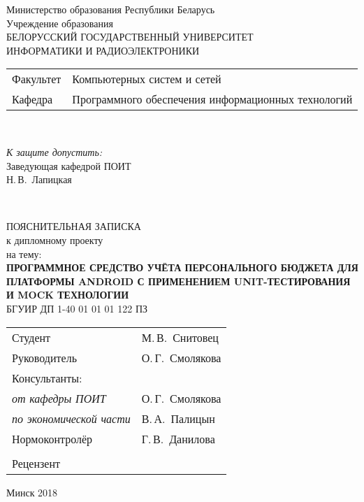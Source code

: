 \begin{titlepage}
  \begin{center}
    Министерство образования Республики Беларусь\\[1em]
    Учреждение образования\\
    БЕЛОРУССКИЙ ГОСУДАРСТВЕННЫЙ УНИВЕРСИТЕТ \\
    ИНФОРМАТИКИ И РАДИОЭЛЕКТРОНИКИ\\[1em]

    \begin{minipage}{\textwidth}
      \begin{flushleft}
        \begin{tabular}{ l l }
          Факультет & Компьютерных систем и сетей\\
          Кафедра   & Программного обеспечения информационных технологий
        \end{tabular}
      \end{flushleft}
    \end{minipage}\\[3em]

    \begin{flushright}
      \begin{minipage}{0.4\textwidth}
        \textit{К защите допустить:}\\[0.8em]
        Заведующая кафедрой ПОИТ\\[0.45em]
        \underline{\hspace*{2.8cm}} Н.\,В.~Лапицкая
      \end{minipage}\\[2.2em]
    \end{flushright}

    {ПОЯСНИТЕЛЬНАЯ ЗАПИСКА}\\
    {к дипломному проекту}\\
    {на тему:}\\[1em]
    \textbf{\large\MakeUppercase{Программное средство учёта персонального бюджета для платформы Android с применением Unit-тестирования и Mock технологии}}\\[1em]


    {БГУИР ДП 1-40 01 01 01 122 ПЗ}\\[2em]
    
    \begin{tabular}{ p{}p{} }
      Студент & М.\,В.~Снитовец \\
      Руководитель & О.\,Г.~Смолякова \\
      Консультанты: &\\
      \hspace*{3ex}\emph{от кафедры ПОИТ} & О.\,Г.~Смолякова \\
      \hspace*{3ex}\emph{по экономической части} & В.\,А.~Палицын \\
      Нормоконтролёр & Г.\,В.~Данилова \\
      & \\
      Рецензент &
    \end{tabular}
    
    \vfill
    {\normalsize Минск 2018}
  \end{center}
\end{titlepage}
